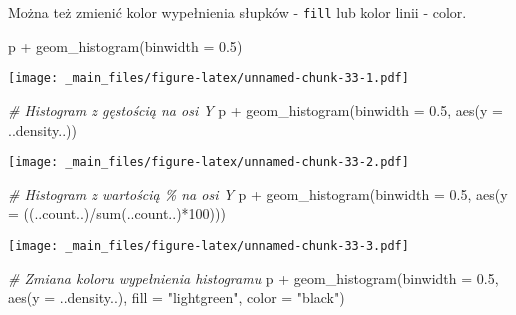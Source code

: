 \documentclass[
]{book}
\newenvironment{Shaded}{\begin{snugshade}}{\end{snugshade}}
\newcommand{\AttributeTok}[1]{\textcolor[rgb]{0.77,0.63,0.00}{#1}}
\newcommand{\CommentTok}[1]{\textcolor[rgb]{0.56,0.35,0.01}{\textit{#1}}}
\newcommand{\DecValTok}[1]{\textcolor[rgb]{0.00,0.00,0.81}{#1}}
\newcommand{\FloatTok}[1]{\textcolor[rgb]{0.00,0.00,0.81}{#1}}
\newcommand{\FunctionTok}[1]{\textcolor[rgb]{0.00,0.00,0.00}{#1}}
\newcommand{\NormalTok}[1]{#1}
\newcommand{\SpecialCharTok}[1]{\textcolor[rgb]{0.00,0.00,0.00}{#1}}
\newcommand{\StringTok}[1]{\textcolor[rgb]{0.31,0.60,0.02}{#1}}
\begin{document}
Można też zmienić kolor wypełnienia słupków - \texttt{fill} lub kolor linii - color.

\begin{Shaded}
\begin{Highlighting}[]
\NormalTok{p }\SpecialCharTok{+} \FunctionTok{geom\_histogram}\NormalTok{(}\AttributeTok{binwidth =} \FloatTok{0.5}\NormalTok{)}
\end{Highlighting}
\end{Shaded}

\texttt{[image: \_main\_files/figure-latex/unnamed-chunk-33-1.pdf]}

\begin{Shaded}
\begin{Highlighting}[]
\CommentTok{\# Histogram z gęstością na osi Y}
\NormalTok{p }\SpecialCharTok{+} \FunctionTok{geom\_histogram}\NormalTok{(}\AttributeTok{binwidth =} \FloatTok{0.5}\NormalTok{, }\FunctionTok{aes}\NormalTok{(}\AttributeTok{y =}\NormalTok{ ..density..))}
\end{Highlighting}
\end{Shaded}

\texttt{[image: \_main\_files/figure-latex/unnamed-chunk-33-2.pdf]}

\begin{Shaded}
\begin{Highlighting}[]
\CommentTok{\# Histogram z wartością \% na osi Y}
\NormalTok{p }\SpecialCharTok{+} \FunctionTok{geom\_histogram}\NormalTok{(}\AttributeTok{binwidth =} \FloatTok{0.5}\NormalTok{, }\FunctionTok{aes}\NormalTok{(}\AttributeTok{y =}\NormalTok{ ((..count..)}\SpecialCharTok{/}\FunctionTok{sum}\NormalTok{(..count..)}\SpecialCharTok{*}\DecValTok{100}\NormalTok{)))}
\end{Highlighting}
\end{Shaded}

\texttt{[image: \_main\_files/figure-latex/unnamed-chunk-33-3.pdf]}

\begin{Shaded}
\begin{Highlighting}[]
\CommentTok{\# Zmiana koloru wypełnienia histogramu}
\NormalTok{p }\SpecialCharTok{+} \FunctionTok{geom\_histogram}\NormalTok{(}\AttributeTok{binwidth =} \FloatTok{0.5}\NormalTok{, }\FunctionTok{aes}\NormalTok{(}\AttributeTok{y =}\NormalTok{ ..density..), }
                   \AttributeTok{fill =} \StringTok{"lightgreen"}\NormalTok{, }\AttributeTok{color =} \StringTok{"black"}\NormalTok{)}
\end{Highlighting}
\end{Shaded}
\end{document}
